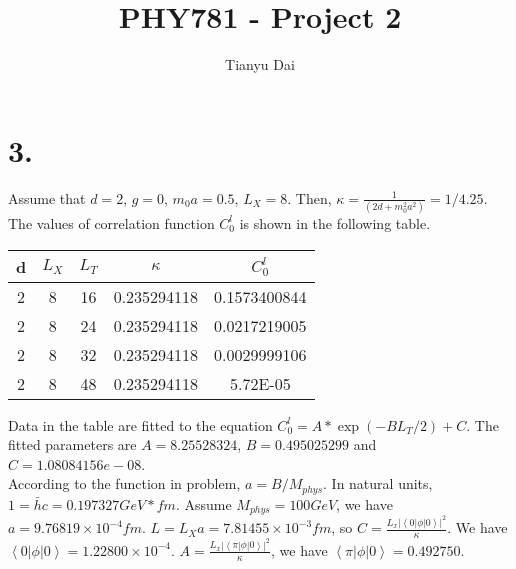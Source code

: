 \documentclass[12pt]{article}
\author{Tianyu Dai}
\title{PHY781 - Project 2}
\date{}
\begin{document}
\maketitle
\section*{3.}
Assume that $d = 2$, $g = 0$, $m_0a = 0.5$, $L_X = 8$. Then, $\kappa = \frac{1}{(2d+m_0^2a^2)} = 1/4.25$. The values of correlation function $C_0^l$ is shown in the following table. \\
\begin{center}
\begin{tabular}{|c|c|c|c|c|}
\hline 
d & $L_X$ & $L_T$ & $\kappa$ & $C^l_0$ \\ 
\hline 
2 & 8 & 16 & 0.235294118 & 0.1573400844\\ 
\hline 
2 & 8 & 24 & 0.235294118 & 0.0217219005\\ 
\hline 
2 & 8 & 32 & 0.235294118 & 0.0029999106\\ 
\hline 
2 & 8 & 48 & 0.235294118 & 5.72E-05\\ 
\hline 

\end{tabular}
\end{center} 
Data in the table are fitted to the equation $C_0^l = A*\exp(-BL_T/2) + C$. The fitted parameters are $A = 8.25528324$, $B = 0.495025299$ and $C = 1.08084156e-08$. \\
According to the function in problem, $a = B/M_{phys}$. In natural units, $1 = \bar{h}c = 0.197327 GeV * fm$. Assume $M_{phys} = 100GeV$, we have $a = 9.76819\times 10^{-4} fm$. $L = L_X a = 7.81455\times10^{-3} fm$, so $C = \frac{L_x|\left<0|\phi|0\right>|^2}{\kappa}$. We have $\left<0|\phi|0\right> = 1.22800\times 10^{-4}$. $A = \frac{L_x|\left<\pi|\phi|0\right>|^2}{\kappa}$, we have $\left<\pi|\phi|0\right> = 0.492750$. \\
\end{document}
